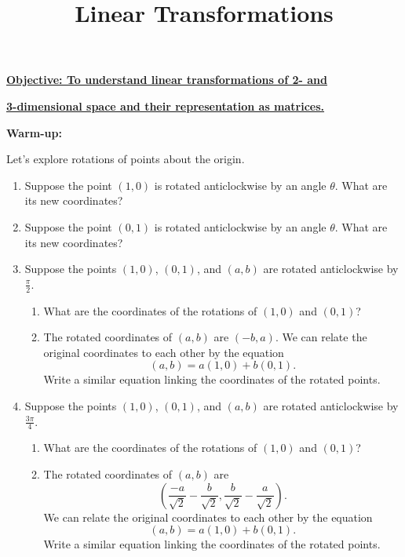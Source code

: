 \documentclass{article}
\begin{document}
\title{Linear Transformations}
\date{}

\maketitle
\thispagestyle{empty}

\Large

\textbf{\underline{Objective: To understand linear transformations of 2- and}}

\textbf{\underline{3-dimensional space and their representation as matrices.}}



\vspace{5mm}



\textbf{Warm-up:}\bigskip



Let's explore rotations of points about the origin.

\begin{enumerate}
\item Suppose the point $(1,0)$ is rotated anticlockwise by an angle $\theta$. What are its new coordinates?
\item Suppose the point $(0,1)$ is rotated anticlockwise by an angle $\theta$. What are its new coordinates?
\item Suppose the points $(1,0)$, $(0,1)$, and $(a,b)$ are rotated anticlockwise by $\frac{\pi}{2}$.
	\begin{enumerate}
	\item What are the coordinates of the rotations of $(1,0)$ and $(0,1)$?
	\item The rotated coordinates of $(a,b)$ are $(-b,a)$.
	We can relate the original coordinates to each other by the equation
	\[ (a,b) = a(1,0) + b(0,1).\]
	Write a similar equation linking the coordinates of the rotated points.
	\end{enumerate}
\item Suppose the points $(1,0)$, $(0,1)$, and $(a,b)$ are rotated anticlockwise by $\frac{3\pi}{4}$.
	\begin{enumerate}
	\item What are the coordinates of the rotations of $(1,0)$ and $(0,1)$?
	\item The rotated coordinates of $(a,b)$ are
	\[\left(\frac{-a}{\sqrt{2}}-\frac{b}{\sqrt{2}},\frac{b}{\sqrt{2}}-\frac{a}{\sqrt{2}}\right).\]
	We can relate the original coordinates to each other by the equation
	\[ (a,b) = a(1,0) + b(0,1).\]
	Write a similar equation linking the coordinates of the rotated points.
	\end{enumerate}
\end{enumerate}
\end{document}
